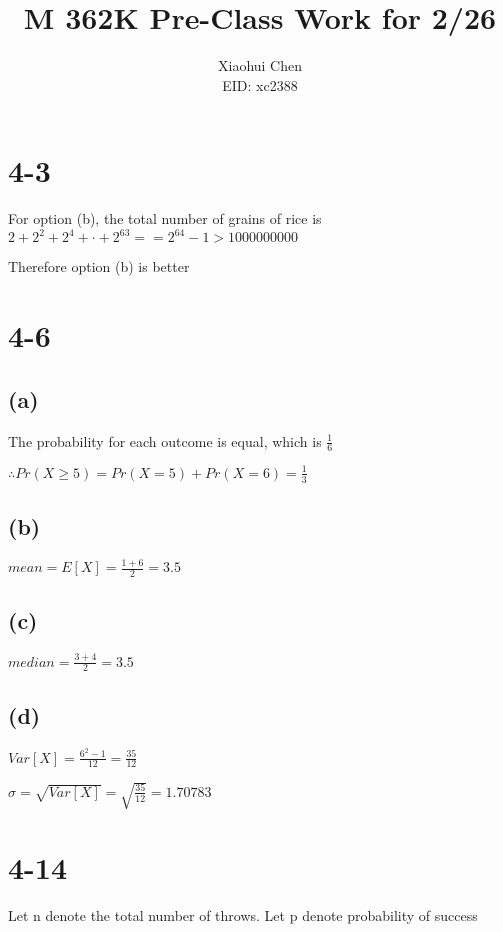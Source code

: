 \documentclass[12pt]{article}
\author{Xiaohui Chen \\EID: xc2388}
\title{M 362K Pre-Class Work for 2/26}
\begin{document}
\maketitle
\begin{spacing}{2.0}

\section*{4-3}

For option (b), the total number of grains of rice is $2+2^2+2^4+ \cdot+ 2^63 = =2^{64}-1 > 1000000000 $

Therefore option (b) is better

\section*{4-6}

\subsection*{(a)}

The probability for each outcome is equal, which is $\frac{1}{6}$

$\therefore Pr(X \ge 5)= Pr(X=5)+Pr(X=6)= \frac{1}{3}$

\subsection*{(b)}

$mean=E[X]=\frac{1+6}{2}=3.5$

\subsection*{(c)}

$median=\frac{3+4}{2}=3.5$

\subsection*{(d)}

$Var[X]=\frac{6^2-1}{12}=\frac{35}{12}$

$\sigma=\sqrt{Var[X]}= \sqrt{\frac{35}{12}}= 1.70783$

\section*{4-14}

Let n denote the total number of throws. Let p denote probability of success


\end{spacing}
\end{document}
